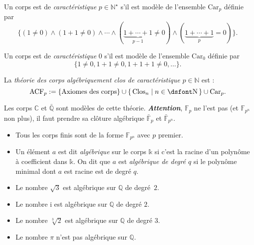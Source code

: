 \documentclass[./main]{subfiles}
\begin{document}
  \begin{defn}
    Un corps est de \textit{caractéristique} $p \in \mathds{N}^\star$ s'il est modèle de l'ensemble $\mathrm{Car}_p$ définie par 
    \[
      \{(1 \neq 0) \land (1 + 1 \neq 0) \land \cdots \land (\underbrace{1 + \cdots +1}_{p-1} \neq 0) \land (\underbrace{1 + \cdots +1}_{p} = 0)\} 
    .\]

    Un corps est de \textit{caractéristique} $0$ s'il est modèle de l'ensemble $\mathrm{Car}_0$ définie par
    \[
      \{1 \neq  0, 1 + 1 \neq 0, 1 + 1 + 1 \neq 0, \ldots\} 
    .\]

    La \textit{théorie des corps algébriquement clos de caractéristique $p \in \mathds{N}$} est :
    \[
      \mathrm{ACF}_p := \{\text{Axiomes des corps}\}  \cup \mleft\{\,\mathrm{Clos}_n \;\middle|\; n \in \mathds{N}\,\mright\} \cup \mathrm{Car}_p
    .\]
  \end{defn}

  \begin{exm}
    Les corps $\mathds{C}$ et $\bar{\mathds{Q}}$ sont modèles de cette théorie.
    \textit{\textbf{Attention}}, $\mathds{F}_p$ ne l'est pas (et $\mathds{F}_{p^n}$ non plus), il faut prendre sa clôture algébrique $\bar{\mathds{F}}_p$ et $\bar{\mathds{F}}_{p^n}$.
  \end{exm}

  \begin{rmk}
    \begin{itemize}
      \item Tous les corps finis sont de la forme $\mathds{F}_{p^n}$ avec $p$ premier.
      \item Un élément $a$ est dit \textit{algébrique} sur le corps $\mathds{k}$ si c'est la racine  d'un polynôme à coefficient dans $\mathds{k}$.
        On dit que $a$ est \textit{algébrique de degré $q$} si le polynôme minimal dont $a$ est racine est de degré $q$.
    \end{itemize}
  \end{rmk}

  \begin{exm}
    \begin{itemize}
      \item Le nombre $\sqrt{3}$ est algébrique sur $\mathds{Q}$ de degré~$2$.
      \item Le nombre $\mathrm{i}$ est algébrique sur $\mathds{Q}$ de degré $2$.
      \item Le nombre $\sqrt[3]{2} $ est algébrique sur $\mathds{Q}$ de degré $3$.
      \item Le nombre $\pi$ n'est pas algébrique sur $\mathds{Q}$.
    \end{itemize}
  \end{exm}
\end{document}
